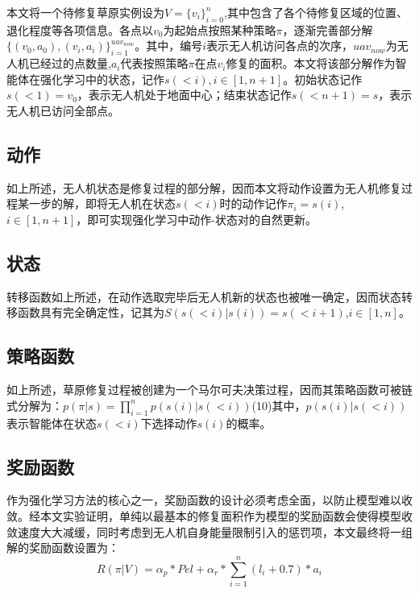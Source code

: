\documentclass[AutoFakeBold]{LZUThesis}
\begin{document}
本文将一个待修复草原实例设为$V=\{v_i\}_{i=0}^n$,其中包含了各个待修复区域的位置、退化程度等各项信息。各点以$v_0$为起始点按照某种策略$\pi$，逐渐完善部分解$\{(v_0,a_0),(v_i,a_i)\}_{i=1}^{uav_{now}}$。其中，编号$i$表示无人机访问各点的次序，$uav_{now}$为无人机已经过的点数量,$a_i$代表按照策略$\pi$在点$v_i$修复的面积。本文将该部分解作为智能体在强化学习中的状态，记作$s(<i),i\in[1,n+1]$。初始状态记作$s(<1)=v_0$，表示无人机处于地面中心；结束状态记作$s(<n+1)=s$，表示无人机已访问全部点。

\subsection{动作}

如上所述，无人机状态是修复过程的部分解，因而本文将动作设置为无人机修复过程某一步的解，即将无人机在状态$s(<i)$时的动作记作$\pi_i=s(i)$,$i\in[1,n+1]$，即可实现强化学习中动作-状态对的自然更新。

\subsection{状态}

转移函数如上所述，在动作选取完毕后无人机新的状态也被唯一确定，因而状态转移函数具有完全确定性，记其为$S(s(<i)|s(i))=s(<i+1)$,$i\in[1,n]$。

\subsection{策略函数}

如上所述，草原修复过程被创建为一个马尔可夫决策过程，因而其策略函数可被链式分解为：$p(\pi|s)=\prod_{i=1}^n p(s(i)|s(<i))$(10)其中，$p(s(i)|s(<i))$表示智能体在状态$s(<i)$下选择动作$s(i)$的概率。

\subsection{奖励函数}

作为强化学习方法的核心之一，奖励函数的设计必须考虑全面，以防止模型难以收敛。经本文实验证明，单纯以最基本的修复面积作为模型的奖励函数会使得模型收敛速度大大减缓，同时考虑到无人机自身能量限制引入的惩罚项，本文最终将一组解的奖励函数设置为：
\begin{equation}
	R(\pi|V)=\alpha_{p}*Pel+\alpha_{r}*\sum_{i=1}^{n}(l_i+0.7)*a_{i}
	\label{eq:11}
\end{equation}
\end{document}
